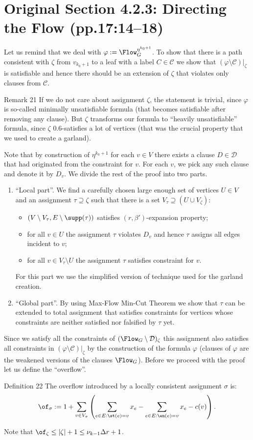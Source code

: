 \section*{Original Section 4.2.3: Directing the Flow (pp.17:14--18)}
Let us remind that we deal with $\varphi:=\Flow_G^{\eta^{k_0+1}}$. To show that there is a path consistent with $\zeta$ from $v_{k_0+1}$ to a leaf with a label $C\in\mathcal C$ we show that $(\varphi\setminus\mathcal C)|_\zeta$ is satisfiable and hence there should be an extension of $\zeta$ that violates only clauses from $\mathcal C$.
\begin{result}{Remark 21}
If we do not care about assignment $\zeta$, the statement is trivial, since $\varphi$ is so-called minimally unsatisfiable formula (that becomes satisfiable after removing any clause). But $\zeta$ transforms our formula to ``heavily unsatisfiable'' formula, since $\zeta$ $0.6$-satisfies a lot of vertices (that was the crucial property that we used to create a garland).
\end{result}
Note that by construction of $\eta^{k_0+1}$ for each $v\in V$ there exists a clause $D\in\mathcal D$ that had originated from the constraint for $v$. For each $v$, we pick any such clause and denote it by $D_v$. We divide the rest of the proof into two parts.
\begin{enumerate}
\item ``Local part''. We find a carefully chosen large enough set of vertices $U\in V$ and an assignment $\tau\supseteq\zeta$ such that there is a set $V_\tau\supseteq(U\cup V_\zeta)$:
\begin{itemize}\item $(V\setminus V_\tau,E\setminus\supp(\tau))$ satisfies $(r,\beta')$-expansion property;
\item for all $v\in U$ the assignment $\tau$ violates $D_v$ and hence $\tau$ assigns all edges incident to $v$;
\item for all $v\in V_\tau\setminus U$ the assignment $\tau$ satisfies constraint for $v$.\end{itemize}
For this part we use the simplified version of technique used for the garland creation.
\item ``Global part''. By using Max-Flow Min-Cut Theorem we show that $\tau$ can be extended to total assignment that satisfies constraints for vertices whose constraints are neither satisfied nor falsified by $\tau$ yet.
\end{enumerate}
Since we satisfy all the constraints of $(\Flow_G\setminus\mathcal D)_\zeta$ this assignment also satisfies all constraints in $(\varphi\setminus\mathcal C)|_\zeta$ by the construction of the formula $\varphi$ (clauses of $\varphi$ are the weakened versions of the clauses $\Flow_G$).
Before we proceed with the proof let us define the ``overflow''.
\begin{result}{Definition 22}
The overflow introduced by a locally consistent assignment $\sigma$ is:
\[\of_\sigma:=1+\sum_{v\in V_\sigma}\left(\sum_{e\in E:\st(e)=v}x_e-\sum_{e\in E:\en(e)=v}x_e-c(v)\right).\]
\end{result}
Note that $\of_\zeta\le|\zeta|+1\le\nu_{k-1}\Delta r+1$.
